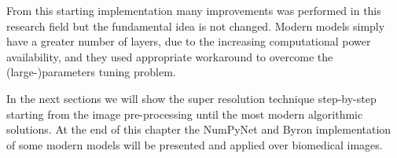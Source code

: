 \documentclass{standalone}
\begin{document}
From this starting implementation many improvements was performed in this research field but the fundamental idea is not changed.
Modern models simply have a greater number of layers, due to the increasing computational power availability, and they used appropriate workaround to overcome the (large-)parameters tuning problem.

In the next sections we will show the super resolution technique step-by-step starting from the image pre-processing until the most modern algorithmic solutions.
At the end of this chapter the NumPyNet and Byron implementation of some modern models will be presented and applied over biomedical images.

\end{document}
